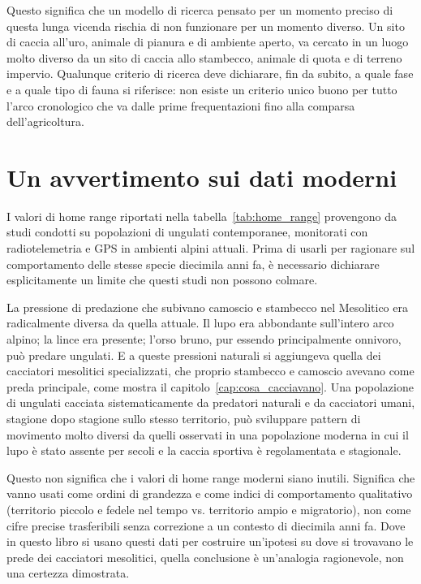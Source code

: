 Questo significa che un modello di ricerca pensato per un momento preciso di questa lunga vicenda rischia di non funzionare per un momento diverso. Un sito di caccia all'uro, animale di pianura e di ambiente aperto, va cercato in un luogo molto diverso da un sito di caccia allo stambecco, animale di quota e di terreno impervio. Qualunque criterio di ricerca deve dichiarare, fin da subito, a quale fase e a quale tipo di fauna si riferisce: non esiste un criterio unico buono per tutto l'arco cronologico che va dalle prime frequentazioni fino alla comparsa dell'agricoltura.

\section{Un avvertimento sui dati moderni}

I valori di home range riportati nella tabella~\ref{tab:home_range} provengono da studi condotti su popolazioni di ungulati contemporanee, monitorati con radiotelemetria e GPS in ambienti alpini attuali. Prima di usarli per ragionare sul comportamento delle stesse specie diecimila anni fa, è necessario dichiarare esplicitamente un limite che questi studi non possono colmare.

La pressione di predazione che subivano camoscio e stambecco nel Mesolitico era radicalmente diversa da quella attuale. Il lupo era abbondante sull'intero arco alpino; la lince era presente; l'orso bruno, pur essendo principalmente onnivoro, può predare ungulati. E a queste pressioni naturali si aggiungeva quella dei cacciatori mesolitici specializzati, che proprio stambecco e camoscio avevano come preda principale, come mostra il capitolo~\ref{cap:cosa_cacciavano}. Una popolazione di ungulati cacciata sistematicamente da predatori naturali e da cacciatori umani, stagione dopo stagione sullo stesso territorio, può sviluppare pattern di movimento molto diversi da quelli osservati in una popolazione moderna in cui il lupo è stato assente per secoli e la caccia sportiva è regolamentata e stagionale.

Questo non significa che i valori di home range moderni siano inutili. Significa che vanno usati come ordini di grandezza e come indici di comportamento qualitativo (territorio piccolo e fedele nel tempo vs. territorio ampio e migratorio), non come cifre precise trasferibili senza correzione a un contesto di diecimila anni fa. Dove in questo libro si usano questi dati per costruire un'ipotesi su dove si trovavano le prede dei cacciatori mesolitici, quella conclusione è un'analogia ragionevole, non una certezza dimostrata.
